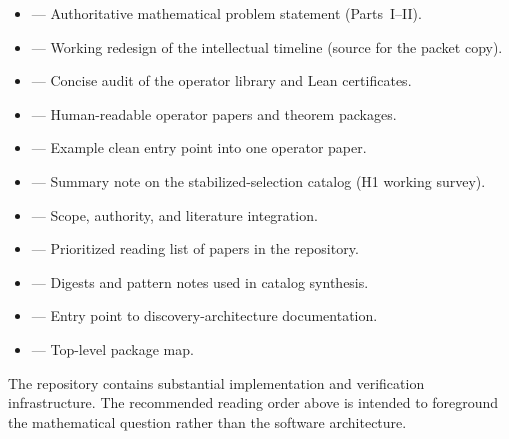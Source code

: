 \documentclass[10.5pt]{article}
\begin{document}
\begin{itemize}[itemsep=2pt]
  \item {} ---
        Authoritative mathematical problem statement (Parts~I--II).
  \item {} ---
        Working redesign of the intellectual timeline (source for the packet copy).
  \item {} ---
        Concise audit of the operator library and Lean certificates.
  \item {} ---
        Human-readable operator papers and theorem packages.
  \item {} ---
        Example clean entry point into one operator paper.
  \item {} ---
        Summary note on the stabilized-selection catalog (H1 working survey).
  \item {} ---
        Scope, authority, and literature integration.
  \item {} ---
        Prioritized reading list of papers in the repository.
  \item {} ---
        Digests and pattern notes used in catalog synthesis.
  \item {} ---
        Entry point to discovery-architecture documentation.
  \item {} ---
        Top-level package map.
\end{itemize}

\begin{tcolorbox}[basebox]
The repository contains substantial implementation and verification infrastructure.
The recommended reading order above is intended to foreground the mathematical question
rather than the software architecture.
\end{tcolorbox}
\end{document}
